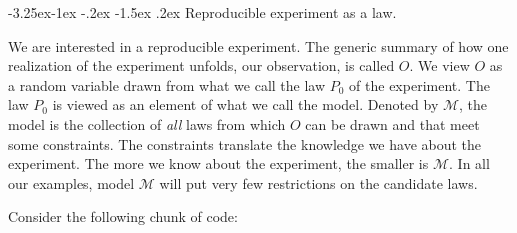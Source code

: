 \documentclass[]{article}
\makeatletter
\renewcommand\subsection{\@startsection{subsection}{3}{\z@}%
                                     {-3.25ex\@plus -1ex \@minus -.2ex}%
                                     {-1.5ex \@plus .2ex}%
                                     {\normalfont\normalsize\bfseries}}
\newcommand{\calM}{\mathcal{M}}
\theoremstyle{definition}
\theoremstyle{definition}
\theoremstyle{definition}
\theoremstyle{remark}
\makeatother
\begin{document}
\subsection{Reproducible experiment as a law.}
\label{subsec:as:a:law}

We are interested in a reproducible experiment. The generic summary of
how one realization of the experiment unfolds, our observation, is
called \(O\). We view \(O\) as a random variable drawn from what we call
the law \(P_{0}\) of the experiment. The law \(P_{0}\) is viewed as an
element of what we call the model. Denoted by \(\calM\), the model is
the collection of \textit{all} laws from which \(O\) can be drawn and
that meet some constraints. The constraints translate the knowledge we
have about the experiment. The more we know about the experiment, the
smaller is \(\calM\). In all our examples, model \(\calM\) will put very
few restrictions on the candidate laws.

Consider the following chunk of code:
\end{document}
